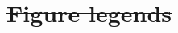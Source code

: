 \documentclass[a4paper]{scrartcl} %
\providecommand{\DIFdeltex}[1]{{\protect\color{red}\sout{#1}}}                      %
\providecommand{\DIFdelend}{} %
\providecommand{\DIFdel}[1]{\texorpdfstring{\DIFdeltex{#1}}{}} %
\DeclareRobustCommand{\DIFdelend}{\DIFOaddend \let\includegraphics\DIFOincludegraphics} %
\begin{document}

\section*{\DIFdel{Figure legends}}




\DIFdelend 
\end{document}
